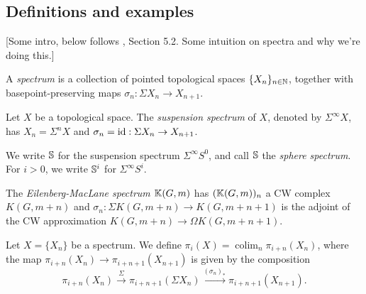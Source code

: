 \documentclass{MetricNotes2023}
\def\bb{\ensuremath\mathbb}
\def\nat{\ensuremath\mathbb{N}}
\def\id{\ensuremath\text{id}}
\DeclareMathOperator{\colim}{colim}
\begin{document}
\subsection{Definitions and examples}

[Some intro, below follows \autocite{hatcher5}, Section 5.2. Some intuition on spectra and why we're doing this.]


\begin{definition}
A \textit{spectrum} is a collection of pointed topological spaces \(\{X_n\}_{n\in \nat}\), together with basepoint-preserving maps \(\sigma_n : \Sigma X_n \to X_{n+1}\).
\end{definition}

\begin{example}
Let \(X\) be a topological space. The \textit{suspension spectrum} of \(X\), denoted by \(\Sigma^\infty X\), has \(X_n=\Sigma^nX\) and \(\sigma_n=\id : \Sigma X_n \to X_{n+1}\).
\end{example}

We write \(\bb{S}\) for the suspension spectrum \(\Sigma^\infty S^0\), and call \(\bb{S}\) the \textit{sphere spectrum}. For \(i>0\), we write \(\bb{S}^i\) for \(\Sigma^\infty S^i\).%

\begin{example}
The \textit{Eilenberg-MacLane spectrum} \(\bb{K}(G,m)\) has \((\bb{K}(G,m))_n\) a CW complex \(K(G,m+n)\) and \(\sigma_n : \Sigma K(G,m+n)\to K(G,m+n+1)\) is the adjoint of the CW approximation \(K(G, m+n)\to \Omega K(G,m+n+1)\).
\end{example}



\begin{definition}
Let \(X=\{X_n\}\) be a spectrum. We define \(\pi_i(X)=\colim_n \pi_{i+n}(X_n)\), where the map \(\pi_{i+n}(X_n)\to \pi_{i+n+1}(X_{n+1})\) is given by the composition
\[\pi_{i+n}(X_n)\xrightarrow{\Sigma}\pi_{i+n+1}(\Sigma X_n)\xrightarrow{(\sigma_n)_*}\pi_{i+n+1}(X_{n+1}).\]
\end{definition}
\end{document}
